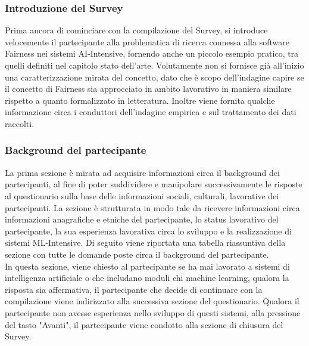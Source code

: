    \subsubsection{Introduzione del Survey}
   Prima ancora di cominciare con la  compilazione del Survey, si introduce velocemente il partecipante alla problematica di ricerca connessa alla software Fairness nei sistemi AI-Intensive, fornendo anche un piccolo esempio pratico, tra quelli definiti nel capitolo stato dell'arte. Volutamente non si fornisce già all'inizio una caratterizzazione mirata del concetto, dato che è scopo dell'indagine capire se il concetto di Fairness sia approcciato in ambito lavorativo in maniera similare rispetto a quanto formalizzato in letteratura. Inoltre viene fornita qualche informazione circa i conduttori dell'indagine empirica e sul trattamento dei dati raccolti. 
   
   \subsubsection{Background del partecipante}
   La prima sezione è mirata ad acquisire informazioni circa il background dei partecipanti, al fine di poter suddividere e manipolare successivamente le risposte al questionario sulla base delle informazioni sociali, culturali, lavorative dei partecipanti. La sezione è strutturata in modo tale da ricevere informazioni circa informazioni anagrafiche e etniche del partecipante, lo status lavorativo del partecipante, la sua esperienza lavorativa circa lo sviluppo e la realizzazione di sistemi ML-Intensive. Di seguito viene riportata una tabella riassuntiva della sezione con tutte le domande poste circa il background del partecipante.\\
   
   In questa sezione, viene chiesto al partecipante se ha mai lavorato a sistemi di intelligenza artificiale o che includano moduli chi machine learning, qualora la risposta sia affermativa, il partecipante che decide di continuare con la compilazione viene indirizzato alla successiva sezione del questionario. Qualora il partecipante non avesse esperienza nello sviluppo di questi sistemi, alla pressione del tasto "Avanti", il partecipante viene condotto alla sezione di chiusura del Survey.
   
